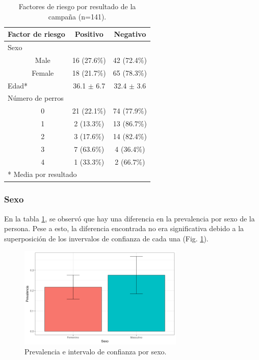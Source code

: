 \begin{table}[h]
	\centering
	\caption{Factores de riesgo por resultado de la campaña (n=141).}\label{PrevFact}
	\begin{tabular}{llll}
		\toprule
		\multicolumn{2}{l}{\textbf{Factor de riesgo}} & \multicolumn{1}{c}{\textbf{Positivo}} & \multicolumn{1}{c}{\textbf{Negativo}} \\
		\midrule
		\multicolumn{2}{l}{Sexo} &       &  \\
		& \multicolumn{1}{c}{Male} & \multicolumn{1}{c}{16 (27.6\%)} & \multicolumn{1}{c}{42 (72.4\%)} \\
		& \multicolumn{1}{c}{Female} & \multicolumn{1}{c}{18 (21.7\%)} & \multicolumn{1}{c}{65 (78.3\%)} \\
		\midrule
		\multicolumn{2}{l}{Edad*} & \multicolumn{1}{c}{36.1 $\pm$ 6.7} & \multicolumn{1}{c}{32.4 $\pm$ 3.6} \\
		\midrule
		\multicolumn{2}{l}{Número de perros} &       &  \\
		& \multicolumn{1}{c}{0} & \multicolumn{1}{c}{21 (22.1\%)} & \multicolumn{1}{c}{74 (77.9\%)} \\
		& \multicolumn{1}{c}{1} & \multicolumn{1}{c}{2 (13.3\%)} & \multicolumn{1}{c}{13 (86.7\%)} \\
		& \multicolumn{1}{c}{2} & \multicolumn{1}{c}{3 (17.6\%)} & \multicolumn{1}{c}{14 (82.4\%)} \\
		& \multicolumn{1}{c}{3} & \multicolumn{1}{c}{7 (63.6\%)} & \multicolumn{1}{c}{4 (36.4\%)} \\
		& \multicolumn{1}{c}{4} & \multicolumn{1}{c}{1 (33.3\%)} & \multicolumn{1}{c}{2 (66.7\%)} \\
		\midrule
		\multicolumn{4}{l}{* Media por resultado} \\
	\end{tabular}%
\end{table}%


\subsubsection{Sexo}
En la tabla \ref{PrevFact}, se observó que hay una diferencia en la prevalencia por sexo de la persona. Pese a esto, la diferencia encontrada no era significativa debido a la superposición de los invervalos de confianza de cada una (Fig. \ref{bar_sexoprevalencia}).

\begin{figure}[h]
	\centering
	\includegraphics[width=0.7\textwidth]{graficos/sexoprevalencia.png}
	\caption{Prevalencia e intervalo de confianza por sexo.}
	\label{bar_sexoprevalencia}
\end{figure}

